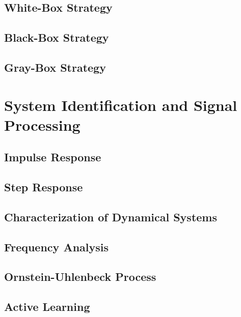 		\subsection{White-Box Strategy} %

		\subsection{Black-Box Strategy} %

		\subsection{Gray-Box Strategy} %

	\section{System Identification and Signal Processing} %

		\subsection{Impulse Response} %

		\subsection{Step Response} %

		\subsection{Characterization of Dynamical Systems} %

		\subsection{Frequency Analysis} %

		\subsection{Ornstein-Uhlenbeck Process} %

		\subsection{Active Learning} %

